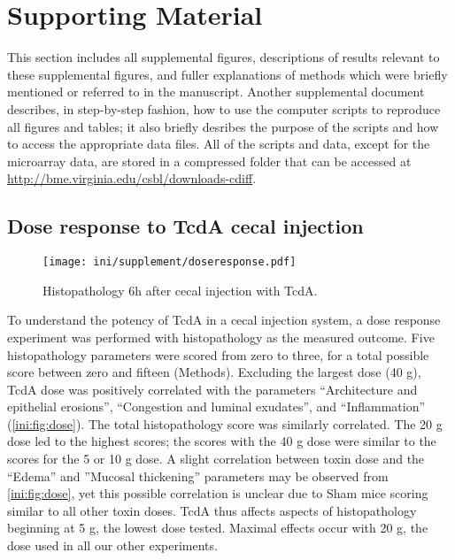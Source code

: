 \doublespacing
\beginsupplement

\section{Supporting Material}

This section includes all supplemental figures, descriptions of results relevant
to these supplemental figures, and fuller explanations of
methods which were briefly mentioned or referred to in
the manuscript. Another supplemental document describes,
in step-by-step fashion, how to use the computer scripts to
reproduce all figures and tables; it also
briefly desribes the purpose of the scripts and how to access the appropriate
data files. All of the scripts and data, except for the microarray data, are stored 
in a compressed folder that can be accessed at
\url{http://bme.virginia.edu/csbl/downloads-cdiff}.

\subsection{Dose response to TcdA cecal injection}

\begin{figure}[b!]
\centering
\texttt{[image: ini/supplement/doseresponse.pdf]}
\caption{Histopathology 6h after cecal injection with TcdA.}
\label{ini:fig:dose}
\end{figure}

To understand the potency of TcdA in a cecal injection system, a dose response
experiment was performed with histopathology as the measured outcome.
Five histopathology parameters were scored from zero to three, for a total possible score
between zero and fifteen (Methods). Excluding the largest dose (40 \textmu{}g),
TcdA dose was positively correlated with the parameters ``Architecture and epithelial erosions'', 
``Congestion and luminal exudates'', and
``Inflammation'' (\autoref{ini:fig:dose}). The total histopathology score was similarly correlated.
The 20 \textmu{}g dose led to the highest scores; the scores with
the 40 \textmu{}g dose were similar to the scores for the 5 or 10 \textmu{}g dose.
A slight correlation between toxin dose and the ``Edema'' and ''Mucosal thickening''
parameters may be observed from \autoref{ini:fig:dose}, yet this possible
correlation is unclear due to Sham mice scoring similar to all other toxin doses.
TcdA thus affects aspects of histopathology beginning at 5 \textmu{}g, the lowest
dose tested. Maximal effects occur with 20 \textmu{}g, the dose used in all our
other experiments.

